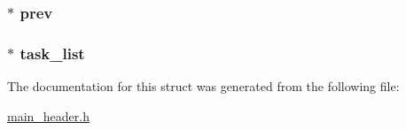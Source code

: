 \subsubsection[{\texorpdfstring{prev}{prev}}]{$\ast$ prev}\hypertarget{struct_mega___data_a588225306923509db138118efa04bf64}{}\label{struct_mega___data_a588225306923509db138118efa04bf64}
\subsubsection[{\texorpdfstring{task\+\_\+list}{task_list}}]{$\ast$ task\+\_\+list}\hypertarget{struct_mega___data_a9d1ac7f39078d6fcc7b9d64dce406123}{}\label{struct_mega___data_a9d1ac7f39078d6fcc7b9d64dce406123}


The documentation for this struct was generated from the following file\+:\begin{DoxyCompactItemize}
\item 
\hyperlink{main__header_8h}{main\+\_\+header.\+h}\end{DoxyCompactItemize}
